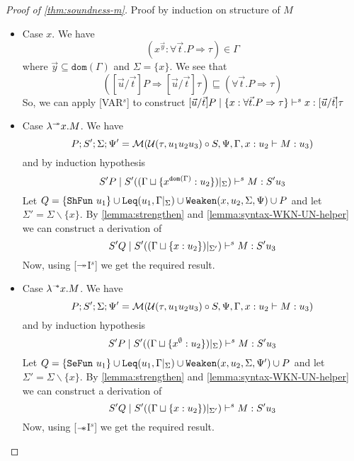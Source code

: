 \begin{proof}[Proof of \cref{thm:soundness-m}]
  Proof by induction on structure of $M$
  \begin{itemize}
  \item{Case $x$.}
    We have $$(x^{\vec{y}}:\forall \vec{t}. P \Rightarrow \tau) \in \Gamma$$ where $\vec{y} \subseteq \texttt{dom}(\Gamma)$ and $\Sigma = \{ x \}$. We see that
    $$([\vec{u}/\vec{t}]P \Rightarrow [\vec{u}/\vec{t}]\tau) \sqsubseteq (\forall \vec{t}. P \Rightarrow \tau)$$
    So, we can apply [VAR$^s$] to construct
    $[\vec{u}/\vec{t}]P \mid \{x:\forall \vec{t}. P \Rightarrow \tau \} \vdash^s x: [\vec{u}/\vec{t}]\tau$

  \item{Case $\lambda^{\twoheadrightarrow} x. M$.}
    We have $$P; S'; \Sigma; \Psi' = \mathcal{M}(\mathcal{U}(\tau, u_1 u_2 u_3) \circ S, \Psi, \Gamma, x:u_2 \vdash M: u_3)$$
    and by induction hypothesis $$S' P \mid S' ((\Gamma \sqcup \{ x^{\texttt{dom}(\Gamma)} : u_2 \})|_{\Sigma}) \vdash^s M : S' u_3$$
    Let $Q = \{\texttt{ShFun}\ u_1\} \cup \texttt{Leq}(u_1, \Gamma|_\Sigma) \cup \texttt{Weaken}(x, u_2, \Sigma, \Psi) \cup P$
    and let $\Sigma' = \Sigma \backslash \{x\}$. By \cref{lemma:strengthen} and \cref{lemma:syntax-WKN-UN-helper} we can construct a
    derivation of $$S' Q \mid S'  ((\Gamma \sqcup \{x:u_2\})|_{\Sigma'}) \vdash^s M: S' u_3$$
    Now, using [$\twoheadrightarrow$I$^s$] we get the required result.

  \item{Case $\lambda^{\mathrel{-\mkern-6mu*}} x. M$.}
    We have $$P; S'; \Sigma; \Psi' = \mathcal{M}(\mathcal{U}(\tau, u_1 u_2 u_3) \circ S, \Psi, \Gamma, x:u_2 \vdash M: u_3)$$
    and by induction hypothesis $$S' P \mid S' ((\Gamma \sqcup \{ x^\emptyset : u_2 \})|_{\Sigma}) \vdash^s M : S' u_3$$
    Let $Q = \{\texttt{SeFun}\ u_1\} \cup \texttt{Leq}(u_1, \Gamma|_\Sigma) \cup \texttt{Weaken}(x, u_2, \Sigma, \Psi') \cup P$
    and let $\Sigma' = \Sigma \backslash \{x\}$. By \cref{lemma:strengthen} and \cref{lemma:syntax-WKN-UN-helper} we can construct a
    derivation of $$S' Q \mid S'  ((\Gamma \sqcup \{x:u_2\})|_{\Sigma'}) \vdash^s M: S' u_3$$
    Now, using [$\mathrel{-\mkern-6mu*}$I$^s$] we get the required result.


\end{itemize}
\end{proof}

